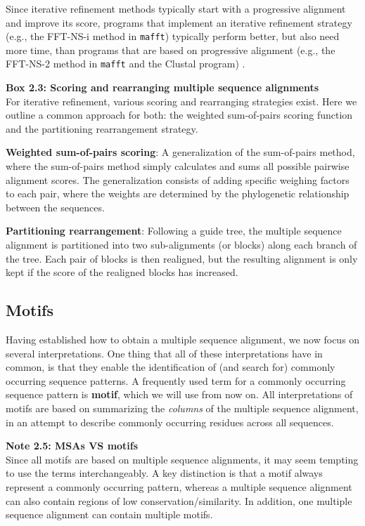 Since iterative refinement methods typically start with a progressive alignment and improve its score, programs that implement an iterative refinement strategy (e.g., the FFT-NS-i method in \texttt{mafft}) typically perform better, but also need more time, than programs that are based on progressive alignment (e.g., the FFT-NS-2 method in \texttt{mafft} and the Clustal program) \cite{katoh_mafft_2014}.

\begin{framed}
\textbf{Box 2.3: Scoring and rearranging multiple sequence alignments}\\
For iterative refinement, various scoring and rearranging strategies exist. Here we outline a common approach for both: the weighted sum-of-pairs scoring function and the partitioning rearrangement strategy.

\textbf{Weighted sum-of-pairs scoring}: A generalization of the sum-of-pairs method, where the sum-of-pairs method simply calculates and sums all possible pairwise alignment scores. The generalization consists of adding specific weighing factors to each pair, where the weights are determined by the phylogenetic relationship between the sequences.

\textbf{Partitioning rearrangement}: Following a guide tree, the multiple sequence alignment is partitioned into two sub-alignments (or blocks) along each branch of the tree. Each pair of blocks is then realigned, but the resulting alignment is only kept if the score of the realigned blocks has increased.
\end{framed}

\subsection{Motifs}

Having established how to obtain a multiple sequence alignment, we now focus on several interpretations. One thing that all of these interpretations have in common, is that they enable the identification of (and search for) commonly occurring sequence patterns. A frequently used term for a commonly occurring sequence pattern is \textbf{motif}, which we will use from now on. All interpretations of motifs are based on summarizing the \textit{columns} of the multiple sequence alignment, in an attempt to describe commonly occurring residues across all sequences.

\begin{framed}
\textbf{Note 2.5: MSAs VS motifs}\\
Since all motifs are based on multiple sequence alignments, it may seem tempting to use the terms interchangeably. A key distinction is that a motif always represent a commonly occurring pattern, whereas a multiple sequence alignment can also contain regions of low conservation/similarity. In addition, one multiple sequence alignment can contain multiple motifs.
\end{framed}

